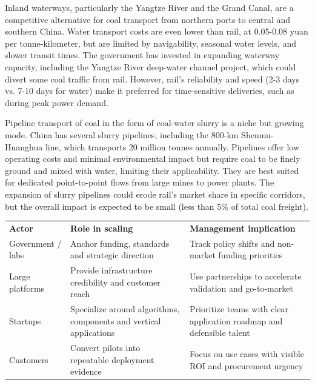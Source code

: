 \documentclass[10pt,a4paper]{article}
\begin{document}
{\small Inland waterways, particularly the Yangtze River and the Grand Canal, are a competitive alternative for coal transport from northern ports to central and southern China. Water transport costs are even lower than rail, at 0.05-0.08 yuan per tonne-kilometer, but are limited by navigability, seasonal water levels, and slower transit times. The government has invested in expanding waterway capacity, including the Yangtze River deep-water channel project, which could divert some coal traffic from rail. However, rail's reliability and speed (2-3 days vs. 7-10 days for water) make it preferred for time-sensitive deliveries, such as during peak power demand.}

{\small Pipeline transport of coal in the form of coal-water slurry is a niche but growing mode. China has several slurry pipelines, including the 800-km Shenmu-Huanghua line, which transports 20 million tonnes annually. Pipelines offer low operating costs and minimal environmental impact but require coal to be finely ground and mixed with water, limiting their applicability. They are best suited for dedicated point-to-point flows from large mines to power plants. The expansion of slurry pipelines could erode rail's market share in specific corridors, but the overall impact is expected to be small (less than 5\% of total coal freight).}
\vspace{3pt}\noindent{}\vspace{4pt}

\vspace{4pt}{\textcolor{BOBlue}{\scriptsize\bfseries ECOSYSTEM ROLE MAP}}\par
\begin{tabularx}{\linewidth}{p{33mm}YY}
\textcolor{BOBlue}{\bfseries Actor} & \textcolor{BOBlue}{\bfseries Role in scaling} & \textcolor{BOBlue}{\bfseries Management implication} \\
Government / labs & Anchor funding, standards and strategic direction & Track policy shifts and non-market funding priorities \\
Large platforms & Provide infrastructure credibility and customer reach & Use partnerships to accelerate validation and go-to-market \\
Startups & Specialize around algorithms, components and vertical applications & Prioritize teams with clear application roadmap and defensible talent \\
Customers & Convert pilots into repeatable deployment evidence & Focus on use cases with visible ROI and procurement urgency \\
\end{tabularx}
\end{document}
